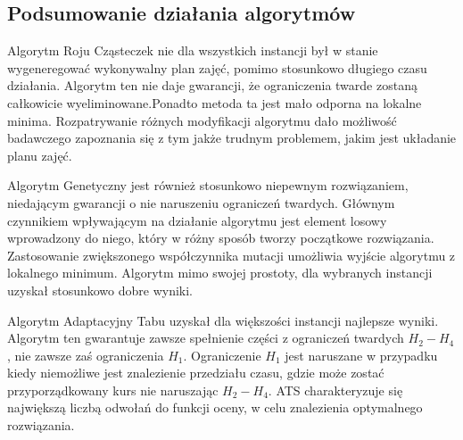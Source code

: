 \subsection{Podsumowanie działania algorytmów}
\par Algorytm Roju Cząsteczek nie dla wszystkich instancji był w stanie wygeneregować wykonywalny plan zajęć, pomimo stosunkowo długiego czasu działania. Algorytm ten nie daje gwarancji, że ograniczenia twarde zostaną całkowicie wyeliminowane.Ponadto metoda ta jest mało odporna na lokalne minima. Rozpatrywanie różnych modyfikacji algorytmu dało możliwość badawczego zapoznania się z tym jakże trudnym problemem, jakim jest układanie planu zajęć.
\par Algorytm Genetyczny jest również stosunkowo niepewnym rozwiązaniem, niedającym gwarancji o nie naruszeniu ograniczeń twardych. Głównym czynnikiem wpływającym na działanie algorytmu jest element losowy wprowadzony do niego, który w różny sposób tworzy początkowe rozwiązania. Zastosowanie zwiększonego współczynnika mutacji umożliwia wyjście algorytmu z lokalnego minimum. Algorytm mimo swojej prostoty, dla wybranych instancji uzyskał stosunkowo dobre wyniki.
\par Algorytm Adaptacyjny Tabu uzyskał dla większości instancji najlepsze wyniki. Algorytm ten gwarantuje zawsze spełnienie części z ograniczeń twardych $H_{2}-H_{4}$, nie zawsze zaś ograniczenia $H_{1}$. Ograniczenie ${H_{1}}$ jest naruszane w przypadku kiedy niemożliwe jest znalezienie przedziału czasu, gdzie może zostać przyporządkowany kurs nie naruszając $H_{2}-H_{4}$. ATS charakteryzuje się największą liczbą odwołań do funkcji oceny, w celu znalezienia optymalnego rozwiązania.







